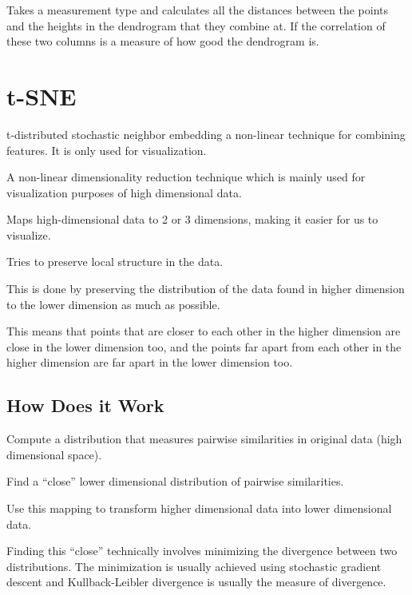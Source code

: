 Takes a measurement type and calculates all the distances between the points and the heights in the dendrogram that they combine at.  If the correlation of these two columns is a measure of how good the dendrogram is.

	\section{t-SNE}
t-distributed stochastic neighbor embedding a non-linear technique for combining features.  It is only used for visualization.
	\begin{bulletedlist}
		\item A non-linear dimensionality reduction technique which is mainly used for visualization purposes of high dimensional data.
		\item Maps high-dimensional data to 2 or 3 dimensions, making it easier for us to visualize.
		\item Tries to preserve local structure in the data.
		\begin{bulletedlist}
			\item This is done by preserving the distribution of the data found in higher dimension to the lower dimension as much as possible.
			\item This means that points that are closer to each other in the higher dimension are close in the lower dimension too, and the points far apart from each other in the higher dimension are far apart in the lower dimension too.
		\end{bulletedlist}
	\end{bulletedlist}

	\subsection{How Does it Work}
	\begin{bulletedlist}
		\item Compute a distribution that measures pairwise similarities in original data (high dimensional space).
		\item Find a ``close'' lower dimensional distribution of pairwise similarities.
		\item Use this mapping to transform higher dimensional data into lower dimensional data.
		\item Finding this ``close''  technically involves minimizing the divergence between two distributions.  The minimization is usually achieved using stochastic gradient descent and Kullback-Leibler divergence is usually the measure of divergence.
	\end{bulletedlist}

